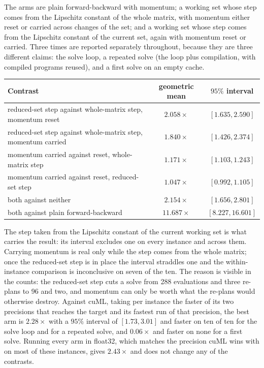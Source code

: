 The arms are plain forward-backward with momentum; a working set whose step
comes from the Lipschitz constant of the whole matrix, with momentum either
reset or carried across changes of the set; and a working set whose step comes
from the Lipschitz constant of the current set, again with momentum reset or
carried. Three times are reported separately throughout, because they are
three different claims: the solve loop, a repeated solve (the loop plus
compilation, with compiled programs reused), and a first solve on an empty
cache.

\begin{center}
\small
\begin{tabular}{lcc}
\toprule
Contrast & geometric mean & $95\%$ interval \\
\midrule
reduced-set step against whole-matrix step, momentum reset & $2.058\times$ & $[1.635, 2.590]$ \\
reduced-set step against whole-matrix step, momentum carried & $1.840\times$ & $[1.426, 2.374]$ \\
momentum carried against reset, whole-matrix step & $1.171\times$ & $[1.103, 1.243]$ \\
momentum carried against reset, reduced-set step & $1.047\times$ & $[0.992, 1.105]$ \\
both against neither & $2.154\times$ & $[1.656, 2.801]$ \\
both against plain forward-backward & $11.687\times$ & $[8.227, 16.601]$ \\
\bottomrule
\end{tabular}
\end{center}

The step taken from the Lipschitz constant of the current working set is what
carries the result: its interval excludes one on every instance and across
them. Carrying momentum is real only while the step comes from the whole
matrix; once the reduced-set step is in place the interval straddles one and
the within-instance comparison is inconclusive on seven of the ten. The reason
is visible in the counts: the reduced-set step cuts a solve from 288
evaluations and three re-plans to 96 and two, and momentum can only be worth
what the re-plans would otherwise destroy. Against cuML, taking per instance
the faster of its two precisions that reaches the target and its fastest run of
that precision, the best arm is $2.28\times$ with a $95\%$ interval of $[1.73,
3.01]$ and faster on ten of ten for the solve loop and for a repeated solve,
and $0.06\times$ and faster on none for a first solve. Running every arm in
float32, which matches the precision cuML wins with on most of these
instances, gives $2.43\times$ and does not change any of the contrasts.

